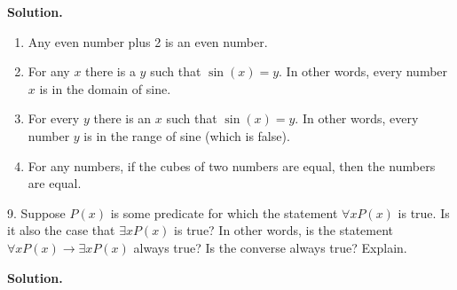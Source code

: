 \documentclass[10pt,]{book}
\theoremstyle{plain}
\theoremstyle{definition}
\theoremstyle{definition}
\theoremstyle{definition}
\numberwithin{equation}{section}
\def\imp{\rightarrow}
\begin{document}
\begin{exerciselist}
\par\smallskip
\par\smallskip
\noindent\textbf{Solution.}\hypertarget{solution-14}{}\quad
\leavevmode%
\begin{enumerate}[label=(\alph*)]
\item\hypertarget{li-141}{} Any even number plus 2 is an even number. %
\item\hypertarget{li-142}{} For any \(x\) there is a \(y\) such that \(\sin(x) = y\). In other words, every number \(x\) is in the domain of sine. %
\item\hypertarget{li-143}{} For every \(y\) there is an \(x\) such that \(\sin(x) = y\). In other words, every number \(y\) is in the range of sine (which is false). %
\item\hypertarget{li-144}{} For any numbers, if the cubes of two numbers are equal, then the numbers are equal. %
\end{enumerate}
\item[9.]\hypertarget{exercise-9}{}
          Suppose \(P(x)\) is some predicate for which the statement \(\forall x P(x)\) is true. Is it also the case that \(\exists x P(x)\) is true? In other words, is the statement \(\forall x P(x) \imp \exists x P(x)\) always true? Is the converse always true? Explain.
\par\smallskip
\par\smallskip
\noindent\textbf{Solution.}\hypertarget{solution-15}{}\quad


\end{exerciselist}
\end{document}
